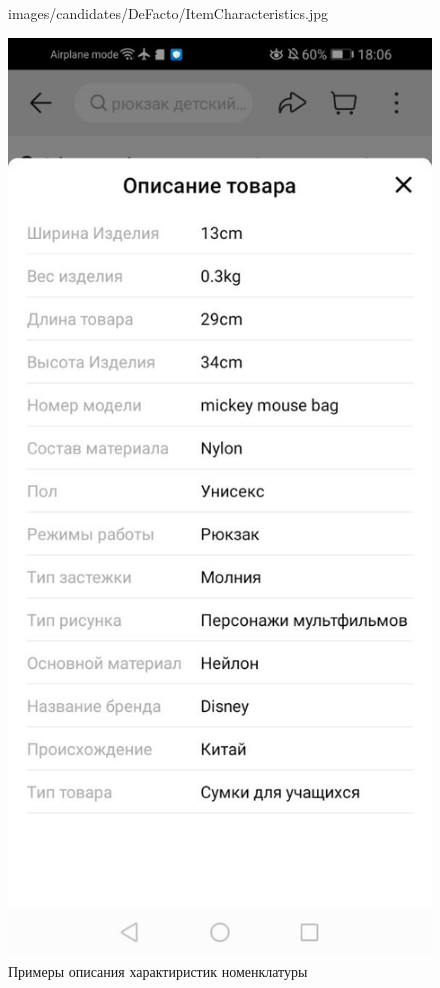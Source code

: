 \begin{figure}[!p]
\begin{minipage}{0.16\textwidth}
    {images/candidates/DeFacto/ItemCharacteristics.jpg}
  \end{minipage}
  \begin{minipage}{0.16\textwidth}
    \includegraphics[width=.99\linewidth]
    {images/candidates/AliExpress/ItemCharacteristics.jpg}
  \end{minipage}

  \caption{Примеры описания характиристик номенклатуры}\label{fig:analyzItemCharacteristic}
\end{figure}

